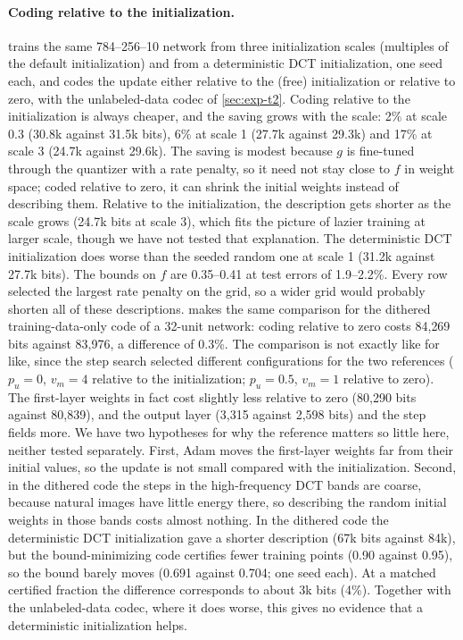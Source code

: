\paragraph{Coding relative to the initialization.}  trains the same 784--256--10 network from three initialization scales (multiples of the default initialization) and from a deterministic DCT initialization, one seed each, and codes the update either relative to the (free) initialization or relative to zero, with the unlabeled-data codec of \cref{sec:exp-t2}. Coding relative to the initialization is always cheaper, and the saving grows with the scale: 2\% at scale 0.3 (30.8k against 31.5k bits), 6\% at scale 1 (27.7k against 29.3k) and 17\% at scale 3 (24.7k against 29.6k). The saving is modest because $g$ is fine-tuned through the quantizer with a rate penalty, so it need not stay close to $f$ in weight space; coded relative to zero, it can shrink the initial weights instead of describing them. Relative to the initialization, the description gets shorter as the scale grows (24.7k bits at scale 3), which fits the picture of lazier training at larger scale, though we have not tested that explanation. The deterministic DCT initialization does worse than the seeded random one at scale 1 (31.2k against 27.7k bits). The bounds on $f$ are 0.35--0.41 at test errors of 1.9--2.2\%. Every row selected the largest rate penalty on the grid, so a wider grid would probably shorten all of these descriptions.  makes the same comparison for the dithered training-data-only code of a 32-unit network: coding relative to zero costs 84{,}269 bits against 83{,}976, a difference of 0.3\%. The comparison is not exactly like for like, since the step search selected different configurations for the two references ($p_u=0$, $v_m=4$ relative to the initialization; $p_u=0.5$, $v_m=1$ relative to zero). The first-layer weights in fact cost slightly less relative to zero (80{,}290 bits against 80{,}839), and the output layer (3{,}315 against 2{,}598 bits) and the step fields more. We have two hypotheses for why the reference matters so little here, neither tested separately. First, Adam moves the first-layer weights far from their initial values, so the update is not small compared with the initialization. Second, in the dithered code the steps in the high-frequency DCT bands are coarse, because natural images have little energy there, so describing the random initial weights in those bands costs almost nothing. In the dithered code the deterministic DCT initialization gave a shorter description (67k bits against 84k), but the bound-minimizing code certifies fewer training points (0.90 against 0.95), so the bound barely moves (0.691 against 0.704; one seed each). At a matched certified fraction the difference corresponds to about 3k bits (4\%). Together with the unlabeled-data codec, where it does worse, this gives no evidence that a deterministic initialization helps.

